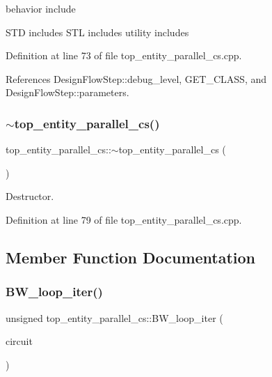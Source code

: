 behavior include 

S\+TD includes S\+TL includes utility includes 

Definition at line 73 of file top\+\_\+entity\+\_\+parallel\+\_\+cs.\+cpp.



References Design\+Flow\+Step\+::debug\+\_\+level, G\+E\+T\+\_\+\+C\+L\+A\+SS, and Design\+Flow\+Step\+::parameters.

\mbox{\label{classtop__entity__parallel__cs_afc7dcd3b8506320d49f863f4da99aaae}} 
\subsubsection{\texorpdfstring{$\sim$top\+\_\+entity\+\_\+parallel\+\_\+cs()}{~top\_entity\_parallel\_cs()}}
{\footnotesize\ttfamily top\+\_\+entity\+\_\+parallel\+\_\+cs\+::$\sim$top\+\_\+entity\+\_\+parallel\+\_\+cs (\begin{DoxyParamCaption}{ }\end{DoxyParamCaption})\hspace{0.3cm}{\ttfamily [virtual]}}



Destructor. 



Definition at line 79 of file top\+\_\+entity\+\_\+parallel\+\_\+cs.\+cpp.



\subsection{Member Function Documentation}
\mbox{\label{classtop__entity__parallel__cs_ab027d23496745ebc6f32b29cafa10759}} 
\subsubsection{\texorpdfstring{B\+W\+\_\+loop\+\_\+iter()}{BW\_loop\_iter()}}
{\footnotesize\ttfamily unsigned top\+\_\+entity\+\_\+parallel\+\_\+cs\+::\+B\+W\+\_\+loop\+\_\+iter (\begin{DoxyParamCaption}\item[{const \hyperlink{structural__objects_8hpp_a8ea5f8cc50ab8f4c31e2751074ff60b2}{structural\+\_\+object\+Ref}}]{circuit }\end{DoxyParamCaption})\hspace{0.3cm}{\ttfamily [protected]}}



